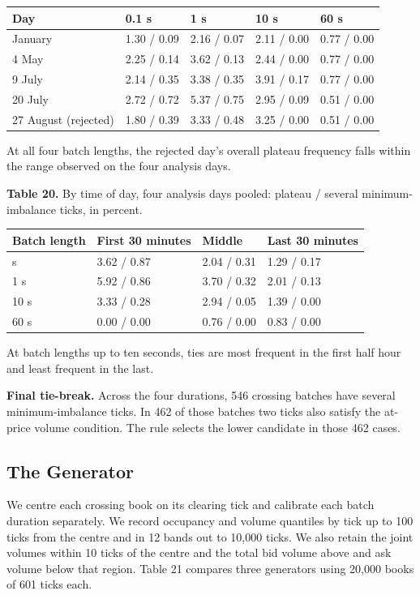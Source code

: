 \begin{longtable}[]{@{}lllll@{}}
\toprule\noalign{}
Day & 0.1 s & 1 s & 10 s & 60 s \\
\midrule\noalign{}
\endhead
\bottomrule\noalign{}
\endlastfoot
23 January & 1.30 / 0.09 & 2.16 / 0.07 & 2.11 / 0.00 & 0.77 / 0.00 \\
4 May & 2.25 / 0.14 & 3.62 / 0.13 & 2.44 / 0.00 & 0.77 / 0.00 \\
9 July & 2.14 / 0.35 & 3.38 / 0.35 & 3.91 / 0.17 & 0.77 / 0.00 \\
20 July & 2.72 / 0.72 & 5.37 / 0.75 & 2.95 / 0.09 & 0.51 / 0.00 \\
27 August (rejected) & 1.80 / 0.39 & 3.33 / 0.48 & 3.25 / 0.00 & 0.51 / 0.00 \\
\end{longtable}

At all four batch lengths, the rejected day's overall plateau frequency falls within the range observed on the four analysis days.

\textbf{Table 20.} By time of day, four analysis days pooled: plateau / several minimum-imbalance ticks, in percent.

\begin{longtable}[]{@{}llll@{}}
\toprule\noalign{}
Batch length & First 30 minutes & Middle & Last 30 minutes \\
\midrule\noalign{}
\endhead
\bottomrule\noalign{}
\endlastfoot
0.1 s & 3.62 / 0.87 & 2.04 / 0.31 & 1.29 / 0.17 \\
1 s & 5.92 / 0.86 & 3.70 / 0.32 & 2.01 / 0.13 \\
10 s & 3.33 / 0.28 & 2.94 / 0.05 & 1.39 / 0.00 \\
60 s & 0.00 / 0.00 & 0.76 / 0.00 & 0.83 / 0.00 \\
\end{longtable}

At batch lengths up to ten seconds, ties are most frequent in the first half hour and least frequent in the last.

\textbf{Final tie-break.} Across the four durations, 546 crossing batches have several minimum-imbalance ticks. In 462 of those batches two ticks also satisfy the at-price volume condition. The rule selects the lower candidate in those 462 cases.

\subsection{The Generator}

We centre each crossing book on its clearing tick and calibrate each batch duration separately. We record occupancy and volume quantiles by tick up to 100 ticks from the centre and in 12 bands out to 10,000 ticks. We also retain the joint volumes within 10 ticks of the centre and the total bid volume above and ask volume below that region. Table 21 compares three generators using 20,000 books of 601 ticks each.

